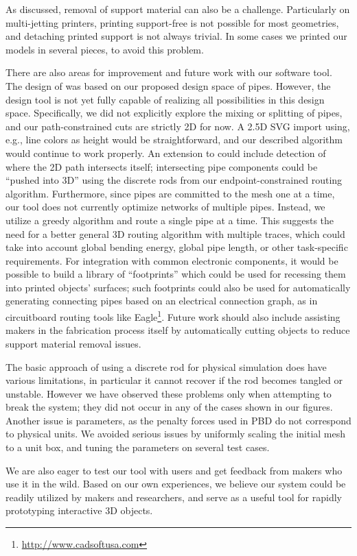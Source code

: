 As discussed, removal of support material can also be a challenge.  Particularly on multi-jetting printers, printing support-free is not possible for most geometries, and detaching printed support is not always trivial. In some cases we printed our models in several pieces, to avoid this problem. 

There are also areas for improvement and future work with our software tool.  The design of \systemname was based on our proposed design space of pipes.  However, the design tool is not yet fully capable of realizing all possibilities in this design space.  Specifically, we did not explicitly explore the mixing or splitting of pipes, and our path-constrained cuts are strictly 2D for now.  A 2.5D SVG import using, e.g., line colors as height would be straightforward, and our described algorithm would continue to work properly.  An extension to \systemname could include detection of where the 2D path intersects itself; intersecting pipe components could be ``pushed into 3D'' using the discrete rods from our endpoint-constrained routing algorithm.  Furthermore, since pipes are committed to the mesh one at a time, our tool does not currently optimize networks of multiple pipes. Instead, we utilize a greedy algorithm and route a single pipe at a time.  This suggests the need for a better general 3D routing algorithm with multiple traces, which could take into account global bending energy, global pipe length, or other task-specific requirements.  For integration with common electronic components, it would be possible to build a library of ``footprints'' which could be used for recessing them into printed objects' surfaces; such footprints could also be used for automatically generating connecting pipes based on an electrical connection graph, as in circuitboard routing tools like Eagle\footnote{\url{http://www.cadsoftusa.com}}.  Future work should also include assisting makers in the fabrication process itself by automatically cutting objects to reduce support material removal issues. %

The basic approach of using a discrete rod for physical simulation does have various limitations, in particular it
cannot recover if the rod becomes tangled or unstable. 
However we have observed these problems only when attempting to break
the system; they did not occur in any of the cases shown in our figures.
Another issue is parameters, as the penalty forces used in PBD do not
correspond to physical units. We avoided serious issues by uniformly
scaling the initial mesh to a unit box, and tuning the parameters on several test cases.

We are also eager to test our tool with users and get feedback from makers who use it in the wild. Based on our own experiences, we believe our system could be readily utilized by makers and researchers, and serve as a useful tool for rapidly prototyping interactive 3D objects.  
